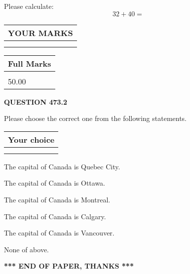 \documentclass[12pt]{article}
\begin{document}
  
 
Please calculate:
\begin{equation}
32 +  %
40 = \nonumber
\end{equation}
 

 

 
  
\vspace{0.2in}
  
\noindent\begin{tabular}{|l|}
\hline
 YOUR MARKS  \\
\hline
 \\ 
 \\ 
\hline
\end{tabular}
\hspace{0.05in} \begin{tabular}{|l|}
\hline
 Full Marks  \\
\hline
 \\ 
50.00 \\
\hline
\end{tabular}
{\textbf{\Large{QUESTION
473.2 
}}}
  
  
Please choose the correct one from the following statements.
  
  
\noindent\hspace{3.0in} \begin{tabular}{|l|}
\hline
Your choice \\
\hline
 \\ 
 \\ 
\hline
\end{tabular}
  
  
 
 
The capital of Canada is Quebec City.
 
 
The capital of Canada is Ottawa.
 
 
The capital of Canada is Montreal.
 
 
The capital of Canada is Calgary.
 
 
The capital of Canada is Vancouver.
 
 
 None of above.
 
 
   
   
 \vspace{0.2in}
 
   
   
   
   
\vspace{1.0in} 
{\textbf{\large{ *** END OF PAPER, THANKS *** }}} 
   
\end{document}
